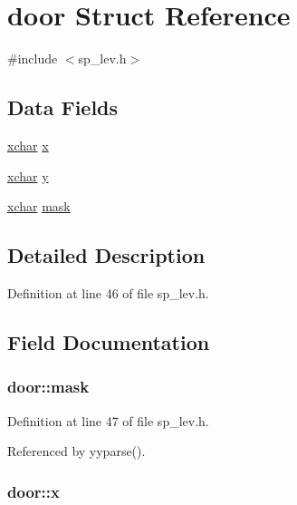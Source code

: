 \hypertarget{structdoor}{\section{door Struct Reference}
\label{structdoor}
}


{\ttfamily \#include $<$sp\+\_\+lev.\+h$>$}

\subsection*{Data Fields}
\begin{DoxyCompactItemize}
\item 
\hyperlink{global_8h_a2043b7d01ce89f4ee2fa6c345a752d32}{xchar} \hyperlink{structdoor_a3741792edd47f3dab69401e6f94e8056}{x}
\item 
\hyperlink{global_8h_a2043b7d01ce89f4ee2fa6c345a752d32}{xchar} \hyperlink{structdoor_a18ca4d1d65808a6121566e988f846e61}{y}
\item 
\hyperlink{global_8h_a2043b7d01ce89f4ee2fa6c345a752d32}{xchar} \hyperlink{structdoor_a8d6c3b2ac1728ee58472948eeec08c86}{mask}
\end{DoxyCompactItemize}


\subsection{Detailed Description}


Definition at line 46 of file sp\+\_\+lev.\+h.



\subsection{Field Documentation}
\hypertarget{structdoor_a8d6c3b2ac1728ee58472948eeec08c86}{
\subsubsection[{mask}]{ door\+::mask}}\label{structdoor_a8d6c3b2ac1728ee58472948eeec08c86}


Definition at line 47 of file sp\+\_\+lev.\+h.



Referenced by yyparse().

\hypertarget{structdoor_a3741792edd47f3dab69401e6f94e8056}{
\subsubsection[{x}]{ door\+::x}}\label{structdoor_a3741792edd47f3dab69401e6f94e8056}


